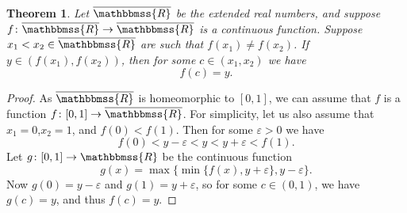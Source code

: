 \documentclass[12pt]{article}
\newcommand{\R}{\mathbbmss{R}}
\newtheorem{thm}{Theorem}
\begin{document}
\begin{thm}
Let $\overline{\R}$ be the extended real numbers, and
suppose $f\colon \overline{\R}\to \overline{\R}$ is a continuous function.
Suppose $x_1<x_2\in \overline{\R}$ are such that $f(x_1)\neq f(x_2)$. If
$y\in(f(x_1),f(x_2))$, then
for some $c\in (x_1,x_2)$ we have 
$$
   f(c)=y.
$$
\end{thm}

\begin{proof}
As $\overline{\R}$ is homeomorphic to $[0,1]$, we can assume that $f$ is a function
$f\colon[0,1]\to \overline{\R}$. For simplicity, 
let us also assume that $x_1=0$,$x_2=1$, and $f(0)<f(1)$. Then
for some $\varepsilon>0$ we have 
$$
  f(0)<y-\varepsilon<y<y+\varepsilon < f(1).
$$
Let $g\colon [0,1]\to \R$ be the continuous function
$$
  g(x) = \operatorname{max}\{ \operatorname{min}\{ f(x), y+\varepsilon\}, y-\varepsilon\}.
$$
Now $g(0)=y-\varepsilon$ and $g(1)=y+\varepsilon$, 
so for some $c\in(0,1)$, we have $g(c)=y$, and thus $f(c)=y$. 
\end{proof}
\end{document}
